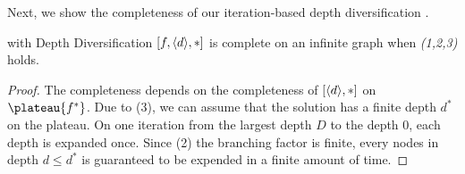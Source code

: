 Next, we show the completeness of our iteration-based depth diversification .


\begin{theo}
 \astar with Depth Diversification $[f,{\left<d\right>},*]$ is complete on an infinite graph
 when \emph{(1,2,3)} holds.
\end{theo}
 
\begin{proof}
 The completeness depends on the completeness of $[{\left<d\right>},*]$ on $\plateau{f^*}$.
 Due to (3), we can assume that the solution has a finite depth $d^*$ on the plateau.
 On one iteration from the largest depth $D$ to the depth 0, each depth is expanded once.
 Since (2) the branching factor is finite,
 every nodes in depth $d\leq d^*$ is guaranteed to be expended in a finite amount of time.
\end{proof}

